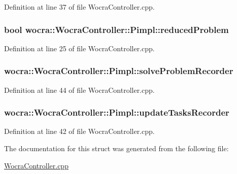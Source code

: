 Definition at line 37 of file Wocra\+Controller.\+cpp.

\subsubsection[{\texorpdfstring{reduced\+Problem}{reducedProblem}}]{\setlength{\rightskip}{0pt plus 5cm}bool wocra\+::\+Wocra\+Controller\+::\+Pimpl\+::reduced\+Problem}\hypertarget{structwocra_1_1WocraController_1_1Pimpl_a809b85a6059fda8abddf709a92224443}{}\label{structwocra_1_1WocraController_1_1Pimpl_a809b85a6059fda8abddf709a92224443}


Definition at line 25 of file Wocra\+Controller.\+cpp.

\subsubsection[{\texorpdfstring{solve\+Problem\+Recorder}{solveProblemRecorder}}]{ wocra\+::\+Wocra\+Controller\+::\+Pimpl\+::solve\+Problem\+Recorder}\hypertarget{structwocra_1_1WocraController_1_1Pimpl_a446e043430909aacb7955ff847c3a311}{}\label{structwocra_1_1WocraController_1_1Pimpl_a446e043430909aacb7955ff847c3a311}


Definition at line 44 of file Wocra\+Controller.\+cpp.

\subsubsection[{\texorpdfstring{update\+Tasks\+Recorder}{updateTasksRecorder}}]{ wocra\+::\+Wocra\+Controller\+::\+Pimpl\+::update\+Tasks\+Recorder}\hypertarget{structwocra_1_1WocraController_1_1Pimpl_a91e262e3ecf52354aefa49e76b9e0eb9}{}\label{structwocra_1_1WocraController_1_1Pimpl_a91e262e3ecf52354aefa49e76b9e0eb9}


Definition at line 42 of file Wocra\+Controller.\+cpp.



The documentation for this struct was generated from the following file\+:\begin{DoxyCompactItemize}
\item 
\hyperlink{WocraController_8cpp}{Wocra\+Controller.\+cpp}\end{DoxyCompactItemize}
